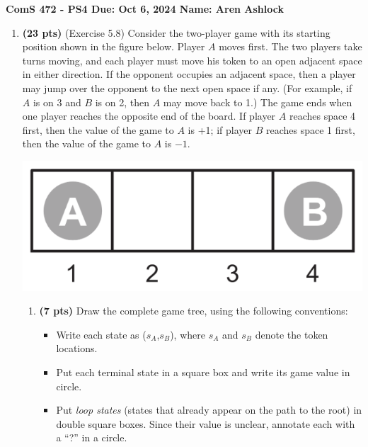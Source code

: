 \documentclass{article}
\begin{document}
\noindent\textbf{ComS 472 - PS4 \quad Due: Oct 6, 2024 \quad Name: Aren Ashlock}

\begin{enumerate}


\item \textbf{(23 pts)} (Exercise 5.8) Consider the two-player game with its starting position shown in the figure below. Player $A$ moves first. The two players take turns moving, and each player must move his token to an open adjacent space in either direction. If the opponent occupies an adjacent space, then a player may jump over the opponent to the next open space if any. (For example, if $A$ is on 3 and $B$ is on 2, then $A$ may move back to 1.) The game ends when one player reaches the opposite end of the board. If player $A$ reaches space 4 first, then the value of the game to $A$ is +1; if player $B$ reaches space 1 first, then the value of the game to $A$ is $-1$.

\begin{center}
    \includegraphics[scale=0.5]{472-PS4-Q1.png}
\end{center}

    \begin{enumerate}[label=($\alph*$)]
    
    
    \item \textbf{(7 pts)} Draw the complete game tree, using the following conventions:

    \begin{itemize}
        \item Write each state as ($s_A$,$s_B$), where $s_A$ and $s_B$ denote the token locations.
        \item Put each terminal state in a square box and write its game value in circle.
        \item Put \textit{loop states} (states that already appear on the path to the root) in double square boxes. Since their value is unclear, annotate each with a “?” in a circle.
    \end{itemize}


\end{enumerate}
\end{enumerate}
\end{document}

